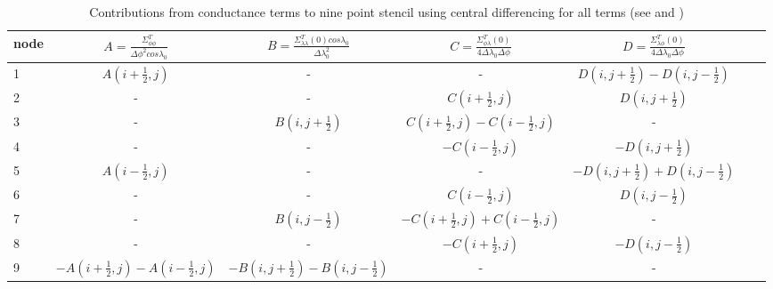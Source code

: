 \begin{table}
\begin{tabular}{|p{0.5cm} ||c|c|c|c|c|c|} \hline
 node  & $ A=\frac{\Sigma_{\phi \phi}^T}{\Delta \phi^2 cos \lambda_0}$
       & $B= \frac{\Sigma_{\lambda \lambda}^T(0) cos \lambda_0}{\Delta \lambda_0^2}$
       & $C= \frac{\Sigma_{\phi \lambda}^T(0)}{4\Delta \lambda_0 \Delta \phi }$
       & $D= \frac{\Sigma_{\lambda \phi}^T(0)}{4 \Delta \lambda_0 \Delta \phi}$  \\ \hline \hline
%
1  &$A(i+\frac{1}{2},j)$ & - & - &$D(i,j+\frac{1}{2})- D(i,j-\frac{1}{2})$    \\ 
2  &-&- &$C(i+\frac{1}{2},j) $ &$D(i,j+\frac{1}{2})$ \\ 
3  &-& $B(i,j+\frac{1}{2}) $&$C(i+\frac{1}{2},j)-C(i-\frac{1}{2},j)$ & -     \\ 
4  &-& -&$ -C(i-\frac{1}{2},j)$ &$ -D(i,j+\frac{1}{2})$      \\ 
5  &$A(i-\frac{1}{2},j)$&- & - & $-D(i,j+\frac{1}{2})+ D(i,j-\frac{1}{2})$   \\ 
6  &-& -&$ C(i-\frac{1}{2},j)$ &$D(i,j-\frac{1}{2})$ \\ 
7  &-&$B(i,j-\frac{1}{2})$ &$ -C(i+\frac{1}{2},j)+C(i-\frac{1}{2},j)$ & -    \\ 
8  &-& -&$ -C(i+\frac{1}{2},j)$ &$-D(i,j-\frac{1}{2})$       \\ 
9  &$-A(i+\frac{1}{2},j)-A(i-\frac{1}{2},j)$&$-B(i,j+\frac{1}{2})-B(i,j-\frac{1}{2})$ & - & -\\ \hline
%
\end{tabular}
\caption{Contributions from conductance terms to nine point stencil using central differencing
for all terms (see  and )}
\label{tab:stencil}
\end{table} 
%
%
